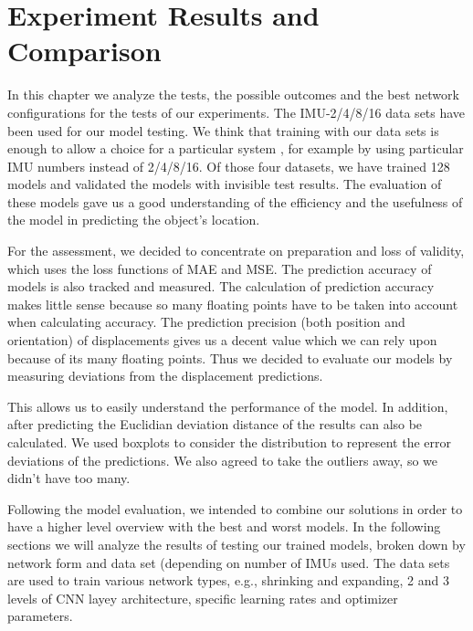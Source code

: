 
\chapter{Experiment Results and Comparison}\label{chapter:experiment_results_and_comparison}

In this chapter we analyze the tests, the possible outcomes and the best network configurations for the tests of our experiments. The IMU-2/4/8/16 data sets have been used for our model testing. We think that training with our data sets is enough to allow a choice for a particular system , for example by using particular IMU numbers instead of 2/4/8/16. Of those four datasets, we have trained 128 models and validated the models with invisible test results. The evaluation of these models gave us a good understanding of the efficiency and the usefulness of the model in predicting the object's location.

For the assessment, we decided to concentrate on preparation and loss of validity, which uses the loss functions of MAE and MSE. The prediction accuracy of models is also tracked and measured. The calculation of prediction accuracy makes little sense because so many floating points have to be taken into account when calculating accuracy. The prediction precision (both position and orientation) of displacements gives us a decent value which we can rely upon because of its many floating points. Thus we decided to evaluate our models by measuring deviations from the displacement predictions.

This allows us to easily understand the performance of the model. In addition, after predicting the Euclidian deviation distance of the results can also be calculated. We used boxplots to consider the distribution to represent the error deviations of the predictions. We also agreed to take the outliers away, so we didn't have too many.

Following the model evaluation, we intended to combine our solutions in order to have a higher level overview with the best and worst models. In the following sections we will analyze the results of testing our trained models, broken down by network form and data set (depending on number of IMUs used. The data sets are used to train various network types, e.g., shrinking and expanding, 2 and 3 levels of CNN layey architecture, specific learning rates and optimizer parameters.  

